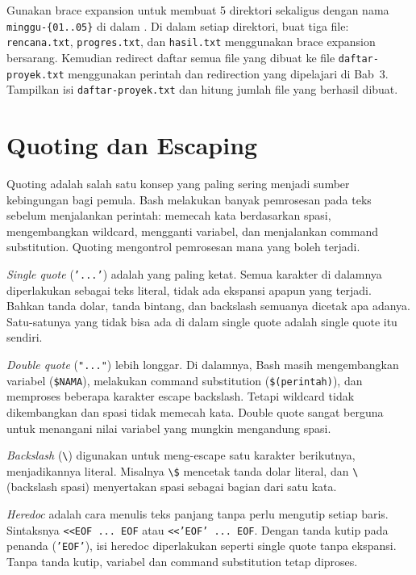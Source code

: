 \begin{challengebox}
Gunakan brace expansion untuk membuat 5 direktori sekaligus dengan nama
\texttt{minggu-\{01..05\}} di dalam .
Di dalam setiap direktori, buat tiga file: \texttt{rencana.txt},
\texttt{progres.txt}, dan \texttt{hasil.txt} menggunakan brace expansion
bersarang. Kemudian redirect daftar semua file yang dibuat ke file
\texttt{daftar-proyek.txt} menggunakan perintah  dan
redirection yang dipelajari di Bab~3. Tampilkan isi
\texttt{daftar-proyek.txt} dan hitung jumlah file yang berhasil dibuat.
\end{challengebox}

\section{Quoting dan Escaping}
\label{sec:quoting-escaping}

Quoting adalah salah satu konsep yang paling sering menjadi sumber
kebingungan bagi pemula. Bash melakukan banyak pemrosesan pada teks sebelum
menjalankan perintah: memecah kata berdasarkan spasi, mengembangkan
wildcard, mengganti variabel, dan menjalankan command substitution. Quoting
mengontrol pemrosesan mana yang boleh terjadi.

\textit{Single quote} (\texttt{'...'}) adalah yang paling ketat. Semua
karakter di dalamnya diperlakukan sebagai teks literal, tidak ada ekspansi
apapun yang terjadi. Bahkan tanda dolar, tanda bintang, dan backslash
semuanya dicetak apa adanya. Satu-satunya yang tidak bisa ada di dalam
single quote adalah single quote itu sendiri.

\textit{Double quote} (\texttt{"..."}) lebih longgar. Di dalamnya, Bash
masih mengembangkan variabel (\texttt{\$NAMA}), melakukan command
substitution (\texttt{\$(perintah)}), dan memproses beberapa karakter
escape backslash. Tetapi wildcard tidak dikembangkan dan spasi tidak
memecah kata. Double quote sangat berguna untuk menangani nilai variabel
yang mungkin mengandung spasi.

\textit{Backslash} (\texttt{\textbackslash}) digunakan untuk meng-escape
satu karakter berikutnya, menjadikannya literal. Misalnya
\texttt{\textbackslash\$} mencetak tanda dolar literal, dan
\texttt{\textbackslash\ } (backslash spasi) menyertakan spasi sebagai
bagian dari satu kata.

\textit{Heredoc} adalah cara menulis teks panjang tanpa perlu mengutip
setiap baris. Sintaksnya \texttt{<<EOF ... EOF} atau
\texttt{<<'EOF' ... EOF}. Dengan tanda kutip pada penanda (\texttt{'EOF'}),
isi heredoc diperlakukan seperti single quote tanpa ekspansi. Tanpa tanda
kutip, variabel dan command substitution tetap diproses.

